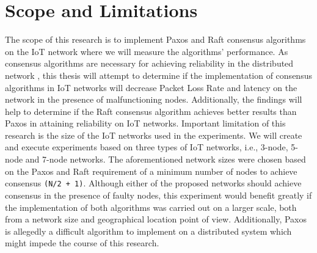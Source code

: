 \documentclass[oneside,12pt]{book}
\begin{document}
\section{Scope and Limitations}
The scope of this research is to implement Paxos and Raft consensus algorithms on the IoT network where we will measure the algorithms’ performance. As consensus algorithms are necessary for achieving reliability in the distributed network \citep{10.1145/357172.357176}, this thesis will attempt to determine if the implementation of consensus algorithms in IoT networks will decrease Packet Loss Rate and latency on the network in the presence of malfunctioning nodes. Additionally, the findings will help to determine if the Raft consensus algorithm achieves better results than Paxos in attaining reliability on IoT networks.\smallskip \newline
Important limitation of this research is the size of the IoT networks used in the experiments. We will create and execute experiments based on three types of IoT networks, i.e., 3-node, 5-node and 7-node networks. The aforementioned network sizes were chosen based on the Paxos and Raft requirement of a minimum number of nodes to achieve consensus \texttt{(N/2 + 1)}. Although either of the proposed networks should achieve consensus in the presence of faulty nodes, this experiment would benefit greatly if the implementation of both algorithms was carried out on a larger scale, both from a network size and geographical location point of view. Additionally, Paxos is allegedly a difficult algorithm to implement on a distributed system \citep{10.5555/2643634.2643666} which might impede the course of this research.
\end{document}
